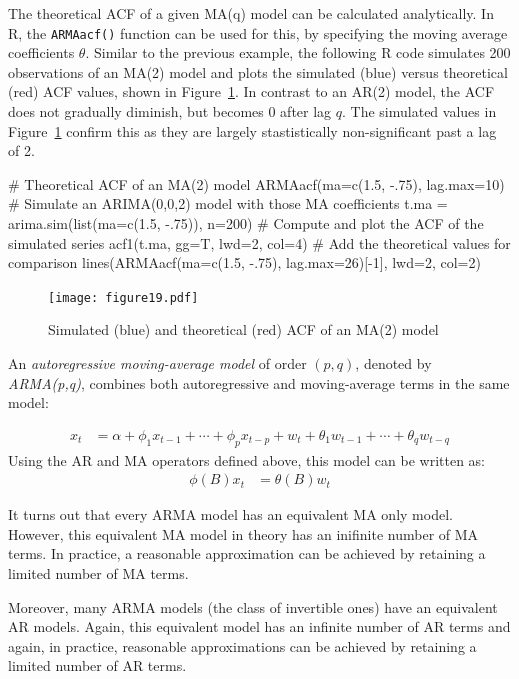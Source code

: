 The theoretical ACF of a given MA(q) model can be calculated analytically. In R, the \texttt{ARMAacf()} function can be used for this, by specifying the moving average coefficients $\theta$. Similar to the previous example, the following R code simulates 200 observations of an MA(2) model and plots the simulated (blue) versus theoretical (red) ACF values, shown in Figure~\ref{fig:figure19}. In contrast to an AR(2) model, the ACF does not gradually diminish, but becomes 0 after lag $q$. The simulated values in Figure~\ref{fig:figure19} confirm this as they are largely stastistically non-significant past a lag of 2.

\begin{Rcode}
# Theoretical ACF of an MA(2) model
ARMAacf(ma=c(1.5, -.75), lag.max=10)
# Simulate an ARIMA(0,0,2) model with those MA coefficients
t.ma = arima.sim(list(ma=c(1.5, -.75)), n=200)
# Compute and plot the ACF of the simulated series
acf1(t.ma, gg=T, lwd=2, col=4)
# Add the theoretical values for comparison
lines(ARMAacf(ma=c(1.5, -.75), lag.max=26)[-1], lwd=2, col=2)
\end{Rcode}

\begin{figure}
\centering
\texttt{[image: figure19.pdf]}
\caption{Simulated (blue) and theoretical (red) ACF of an MA(2) model}
\label{fig:figure19}
\end{figure}

An \emph{autoregressive moving-average model} of order $(p, q)$, denoted by \emph{ARMA(p,q)}, combines both autoregressive and moving-average terms in the same model:

\begin{align*}
x_t &= \alpha + \phi_1 x_{t-1} + \cdots + \phi_p x_{t-p} + w_t + \theta_1 w_{t-1} + \cdots + \theta_q w_{t-q} 
\end{align*}
\noindent Using the AR and MA operators defined above, this model can be written as:
\begin{align*}
\phi(B) x_t &= \theta (B) w_t 
\end{align*}

It turns out that every ARMA model has an equivalent MA only model. However, this equivalent MA model in theory has an inifinite number of MA terms. In practice, a reasonable approximation can be achieved by retaining a limited number of MA terms.

Moreover, many ARMA models (the class of invertible ones) have an equivalent AR models. Again, this equivalent model has an infinite number of AR terms and again, in practice, reasonable approximations can be achieved by retaining a limited number of AR terms.

